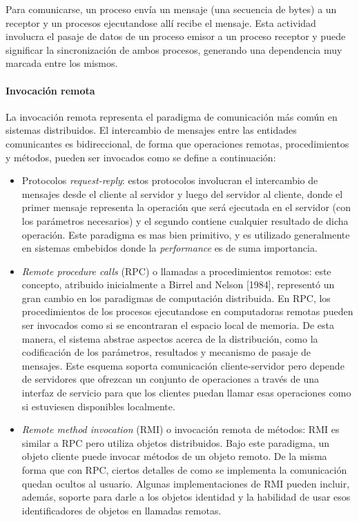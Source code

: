 \documentclass[a4paper,10pt, oneside]{article}
\begin{document}
Para comunicarse, un proceso envía un mensaje (una secuencia de bytes) a un receptor y un procesos ejecutandose allí recibe el mensaje. Esta actividad involucra el pasaje de datos de un proceso emisor a un proceso receptor y puede significar la sincronización de ambos procesos, generando una dependencia muy marcada entre los mismos.

\paragraph{Invocación remota}
La invocación remota representa el paradigma de comunicación más común en sistemas distribuidos. El intercambio de mensajes entre las entidades comunicantes es bidireccional, de forma que operaciones remotas, procedimientos y métodos, pueden ser invocados como se define a continuación:
\begin{itemize}
	\item Protocolos \textit{request-reply}: estos protocolos involucran el intercambio de mensajes desde el cliente al servidor y luego del servidor al cliente, donde el primer mensaje representa la operación que será ejecutada en el servidor (con los parámetros necesarios) y el segundo contiene cualquier resultado de dicha operación. Este paradigma es mas bien primitivo, y es utilizado generalmente en sistemas embebidos donde la \textit{performance} es de suma importancia.
	\item \textit{Remote procedure calls} (RPC) o llamadas a procedimientos remotos: este concepto, atribuido inicialmente a Birrel and Nelson [1984], representó un gran cambio en los paradigmas de computación distribuida. En RPC, los procedimientos de los procesos ejecutandose en computadoras remotas pueden ser invocados como si se encontraran el espacio local de memoria. De esta manera, el sistema abstrae aspectos acerca de la distribución, como la codificación de los parámetros, resultados y mecanismo de pasaje de  mensajes. Este esquema soporta comunicación cliente-servidor pero depende de servidores que ofrezcan un conjunto de operaciones a través de una interfaz de servicio para que los clientes puedan llamar esas operaciones como si estuviesen disponibles localmente.
	\item \textit{Remote method invocation} (RMI) o invocación remota de métodos: RMI es similar a RPC pero utiliza objetos distribuidos. Bajo este paradigma, un objeto cliente puede invocar métodos de un objeto remoto. De la misma forma que con RPC, ciertos detalles de como se implementa la comunicación quedan ocultos al usuario. Algunas implementaciones de RMI pueden incluir, además, soporte para darle a los objetos identidad y la habilidad de usar esos identificadores de objetos en llamadas remotas.
\end{itemize}
\end{document}
